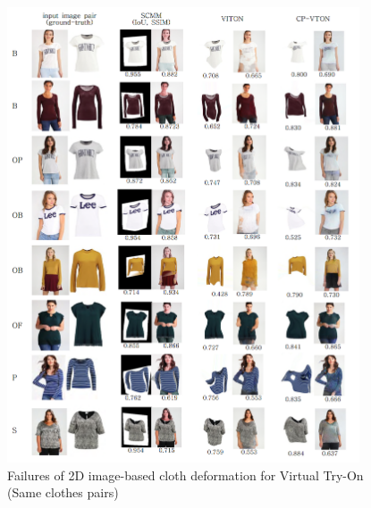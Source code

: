 \begin{figure}[t]
\centering
\includegraphics[height=13.5cm, scale=1]{figures/2dvton_same.png}   %
\caption{Failures of 2D image-based cloth deformation for Virtual Try-On (Same clothes pairs)}
\label{fig:classified2DVTONresult}
\end{figure}




